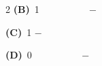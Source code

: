 \documentclass[a4paper,10pt,twoside]{article}
\begin{document}
\begin{multicols}{2}
\textbf{(B)}~1    \newline  \newline  \newline  \newline  \newline  \newline  \newline  \newline  \newline − \newline  \newline  \newline  \newline \par\vspace{2pt}\noindent
\textbf{(C)}~1    \newline − \newline  \newline  \newline  \newline  \newline  \newline  \newline  \newline  \newline  \newline  \newline  \newline \par\vspace{2pt}\noindent
\textbf{(D)}~0    \newline  \newline  \newline  \newline  \newline  \newline  \newline  \newline  \newline − \newline  \newline  \newline  \newline 

\end{multicols}
\end{document}
